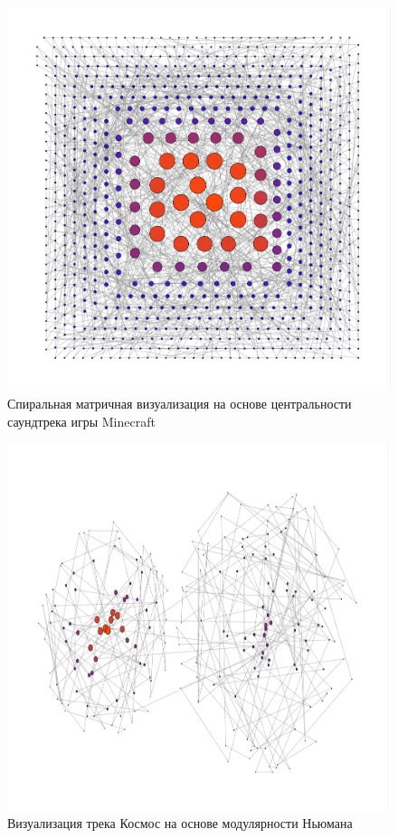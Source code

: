 \documentclass{article}
\begin{document}
\begin{figure}[h]
	\centering
	\includegraphics[scale=0.6]{tools/minecraft_4.png}
	\caption{Спиральная матричная визуализация на основе центральности саундтрека игры Minecraft}
\end{figure}

\begin{figure}[h]
	\centering
	\includegraphics[scale=0.6]{tools/space_1.png}
	\caption{Визуализация трека Космос на основе модулярности Ньюмана}
\end{figure}
\end{document}
